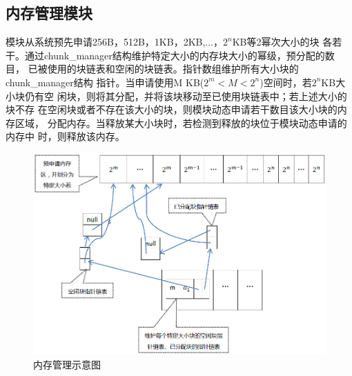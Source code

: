 
%
\subsection{内存管理模块}
		模块从系统预先申请256B，512B，1KB，2KB,$\ldots$，$2^n$KB等2幂次大小的块
		各若干。通过chunk\_manager结构维护特定大小的内存块大小的幂级，预分配的数目，
		已被使用的块链表和空闲的块链表。指针数组维护所有大小块的chunk\_manager结构
		指针。当申请使用M KB($2^m < M < 2^n$)空间时，若$2^n$KB大小块仍有空
		闲块，则将其分配，并将该块移动至已使用块链表中；若上述大小的块不存
		在空闲块或者不存在该大小的块，则模块动态申请若干数目该大小块的内存区域，
		分配内存。当释放某大小块时，若检测到释放的块位于模块动态申请的内存中
		时，则释放该内存。
\begin{figure}[H]
\centering
\includegraphics[keepaspectratio,scale=0.5]{pitures/mm.png}
\caption{内存管理示意图}
\end{figure}


